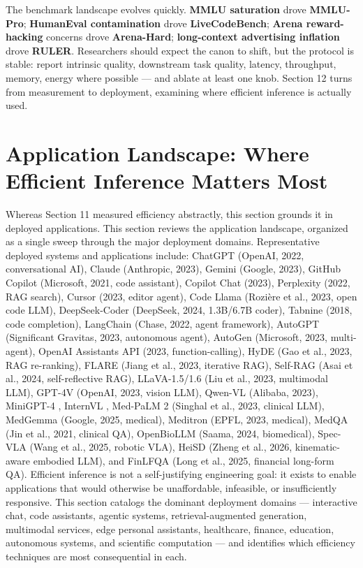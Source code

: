 \documentclass{article}
\begin{document}
The benchmark landscape evolves quickly. \textbf{MMLU saturation} drove \textbf{MMLU-Pro}; \textbf{HumanEval contamination} drove \textbf{LiveCodeBench}; \textbf{Arena reward-hacking} concerns drove \textbf{Arena-Hard}; \textbf{long-context advertising inflation} drove \textbf{RULER}. Researchers should expect the canon to shift, but the protocol is stable: report intrinsic quality, downstream task quality, latency, throughput, memory, energy where possible --- and ablate at least one knob. Section 12 turns from measurement to deployment, examining where efficient inference is actually used.

\section{Application Landscape: Where Efficient Inference Matters Most}\label{application-landscape-where-efficient-inference-matters-most}

Whereas Section 11 measured efficiency abstractly, this section grounds it in deployed applications. This section reviews the application landscape, organized as a single sweep through the major deployment domains. Representative deployed systems and applications include: ChatGPT (OpenAI, 2022, conversational AI), Claude (Anthropic, 2023), Gemini (Google, 2023), GitHub Copilot (Microsoft, 2021, code assistant), Copilot Chat (2023), Perplexity (2022, RAG search), Cursor (2023, editor agent), Code Llama (Rozière et al., 2023, open code LLM), DeepSeek-Coder (DeepSeek, 2024, 1.3B/6.7B coder), Tabnine (2018, code completion), LangChain (Chase, 2022, agent framework), AutoGPT (Significant Gravitas, 2023, autonomous agent), AutoGen (Microsoft, 2023, multi-agent), OpenAI Assistants API (2023, function-calling), HyDE (Gao et al., 2023, RAG re-ranking), FLARE (Jiang et al., 2023, iterative RAG), Self-RAG (Asai et al., 2024, self-reflective RAG), LLaVA-1.5/1.6 (Liu et al., 2023, multimodal LLM), GPT-4V (OpenAI, 2023, vision LLM), Qwen-VL (Alibaba, 2023), MiniGPT-4 \citep{zhu20242024}, InternVL \citep{chen20242024}, Med-PaLM 2 (Singhal et al., 2023, clinical LLM), MedGemma (Google, 2025, medical), Meditron (EPFL, 2023, medical), MedQA (Jin et al., 2021, clinical QA), OpenBioLLM (Saama, 2024, biomedical), Spec-VLA (Wang et al., 2025, robotic VLA), HeiSD (Zheng et al., 2026, kinematic-aware embodied LLM), and FinLFQA (Long et al., 2025, financial long-form QA). Efficient inference is not a self-justifying engineering goal: it exists to enable applications that would otherwise be unaffordable, infeasible, or insufficiently responsive. This section catalogs the dominant deployment domains --- interactive chat, code assistants, agentic systems, retrieval-augmented generation, multimodal services, edge personal assistants, healthcare, finance, education, autonomous systems, and scientific computation --- and identifies which efficiency techniques are most consequential in each.
\end{document}
